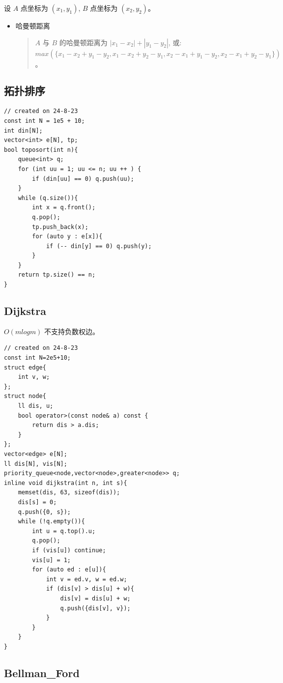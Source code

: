 \documentclass[a4paper,12pt]{article}
\begin{document}
\noindent 设 $A$ 点坐标为 $(x_1,y_1)$, $B$ 点坐标为 $(x_2,y_2)$。

\begin{itemize}
    \item 哈曼顿距离
    \begin{quote}
        $A$ 与 $B$ 的哈曼顿距离为 $|x_1-x_2|+|y_1-y_2|$, 或:
        $max(\{x_1-x_2+y_1-y_2,x_1-x_2+y_2-y_1,x_2-x_1+y_1-y_2,x_2-x_1+y_2-y_1\})$。       
    \end{quote}
\end{itemize}

\subsection{拓扑排序}

\begin{lstlisting}
// created on 24-8-23
const int N = 1e5 + 10;
int din[N];
vector<int> e[N], tp;
bool toposort(int n){
    queue<int> q;
    for (int uu = 1; uu <= n; uu ++ ) {
        if (din[uu] == 0) q.push(uu);
    }
    while (q.size()){
        int x = q.front();
        q.pop();
        tp.push_back(x);
        for (auto y : e[x]){
            if (-- din[y] == 0) q.push(y);
        }
    }
    return tp.size() == n;
}
\end{lstlisting}

\subsection{Dijkstra}

\noindent $O(mlogm)$ 不支持负数权边。

\begin{lstlisting}
// created on 24-8-23
const int N=2e5+10;
struct edge{ 
    int v, w; 
};
struct node{
    ll dis, u;
    bool operator>(const node& a) const {
        return dis > a.dis;
    }
};
vector<edge> e[N];
ll dis[N], vis[N];
priority_queue<node,vector<node>,greater<node>> q;
inline void dijkstra(int n, int s){
    memset(dis, 63, sizeof(dis));
    dis[s] = 0;
    q.push({0, s});
    while (!q.empty()){
        int u = q.top().u;
        q.pop();
        if (vis[u]) continue;
        vis[u] = 1;
        for (auto ed : e[u]){
            int v = ed.v, w = ed.w;
            if (dis[v] > dis[u] + w){
                dis[v] = dis[u] + w;
                q.push({dis[v], v});
            }
        }
    }
}    
\end{lstlisting}

\subsection{Bellman\_Ford}
\end{document}
